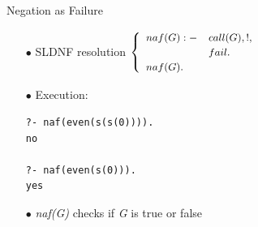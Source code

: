 \documentclass[pdf,slideColor,contemporain]{prosper}
\begin{document}
\begin{slide}{Negation as Failure}
\begin{itemize}

\vspace{-0.2cm}
\item[{\blue $\bullet$}] SLDNF resolution  $
         {\small
         \begin{cases}
         \begin{array}{ll}
              naf(G) :- & call(G),!, \\
                        & fail. \\
              naf(G). &
          \end{array}
          \end{cases}} $\\

\vspace{0.2cm}

\item[{\blue $\bullet$}] Execution:
\begin{tiny}
\begin{verbatim}
?- naf(even(s(s(0)))).          
no                               

?- naf(even(s(0))).              
yes                             
\end{verbatim}
\end{tiny}
\vspace{0.2cm}
\item[{\blue $\bullet$}] \emph{naf(G)} checks if \emph{G} is true or false
\end{itemize}
\end{slide}
\end{document}
